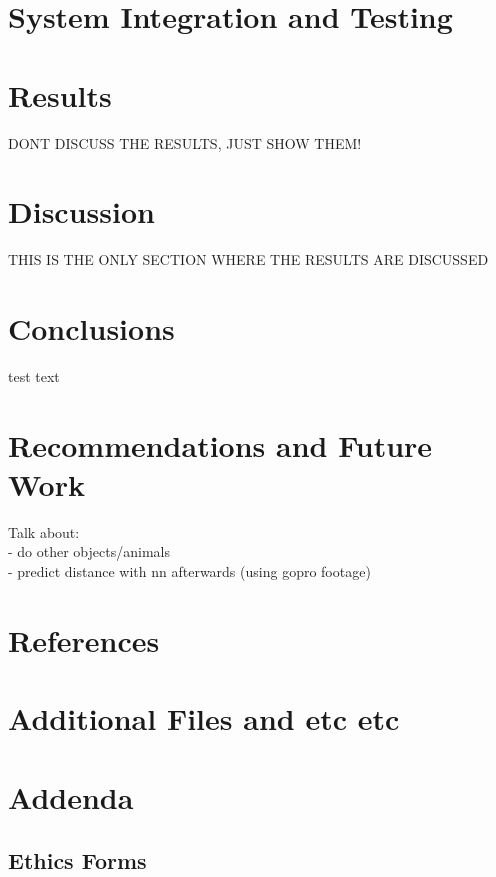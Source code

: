 \documentclass{article}
\begin{document}



\newpage




\section{System Integration and Testing}

\section{Results}
DONT DISCUSS THE RESULTS, JUST SHOW THEM!

\section{Discussion}
THIS IS THE ONLY SECTION WHERE THE RESULTS ARE DISCUSSED

\section{Conclusions}
test text

\section{Recommendations and Future Work}
Talk about: \\
- do other objects/animals \\
- predict distance with nn afterwards (using gopro footage)

\section{References}

\appendix
\section{Additional Files and etc etc}

\section{Addenda}
\subsection{Ethics Forms}

\end{document}
